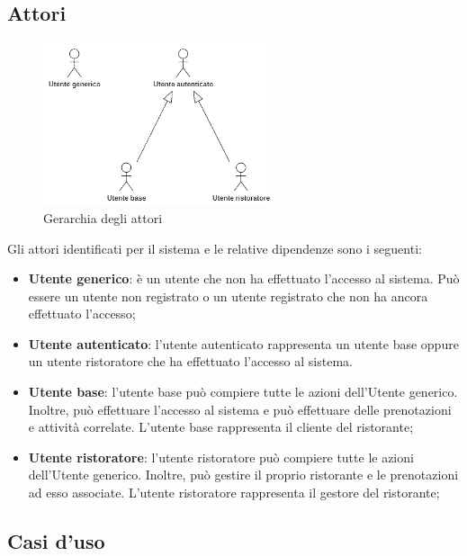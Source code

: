 \newpage
\subsection{Attori}

\begin{figure}[h]
	\centering
	\includegraphics[width=0.6\textwidth]{./uml/gerarchia_attori.png} 
	\caption{Gerarchia degli attori}
\end{figure}

Gli attori identificati per il sistema e le relative dipendenze sono i seguenti:
\begin{itemize}
	\item \textbf{Utente generico}: è un utente che non ha effettuato l'accesso al
	      sistema. Può essere un utente non registrato o un utente registrato che non ha
	      ancora effettuato l'accesso;

	\item \textbf{Utente autenticato}: l'utente autenticato rappresenta un utente
	      base oppure un utente ristoratore che ha effettuato l'accesso al sistema.

	\item \textbf{Utente base}: l'utente base può compiere tutte le azioni
	      dell'Utente generico. Inoltre, può effettuare l'accesso al sistema e può
	      effettuare delle prenotazioni e attività correlate. L'utente base rappresenta
	      il cliente del ristorante;

	\item \textbf{Utente ristoratore}: l'utente ristoratore può compiere tutte le
	      azioni dell'Utente generico. Inoltre, può gestire il proprio ristorante e le
	      prenotazioni ad esso associate. L'utente ristoratore rappresenta il gestore del
	      ristorante;
\end{itemize}

\newpage
\subsection{Casi d'uso}